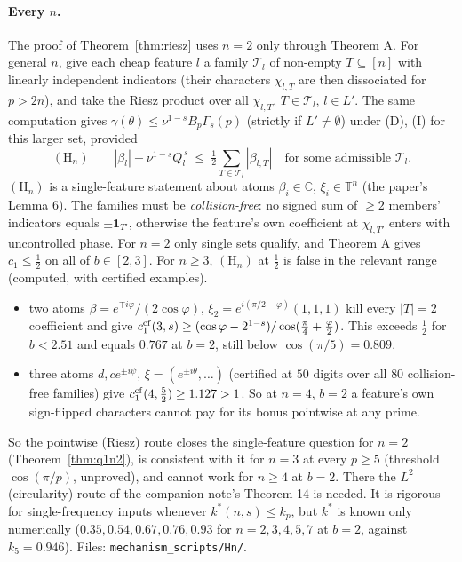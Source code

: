 \documentclass[11pt]{article}
\theoremstyle{definition}
\begin{document}
\paragraph{Every $n$.}  The proof of Theorem~\ref{thm:riesz} uses $n=2$ only through Theorem A.  For general $n$, give each
cheap feature $l$ a family $\mathcal T_l$ of non-empty $T\subseteq[n]$ with linearly independent indicators (their characters
$\chi_{l,T}$ are then dissociated for $p>2n$), and take the Riesz product over all $\chi_{l,T}$, $T\in\mathcal T_l$, $l\in L'$.  The same
computation gives $\gamma(\theta)\le\nu^{1-s}B_p\Gamma_s(p)$ (strictly if $L'\ne\emptyset$) under (D), (I) for this larger set, provided
\[(\mathrm H_n)\qquad|\beta_l|-\nu^{1-s}Q_l^{\,s}\ \le\ \tfrac12\textstyle\sum_{T\in\mathcal T_l}|\beta_{l,T}|\quad\text{for some admissible }\mathcal T_l .\]
$(\mathrm H_n)$ is a single-feature statement about atoms $\beta_i\in\mathbb C$, $\xi_i\in\mathbb T^n$ (the paper's Lemma 6).  The families must be
\emph{collision-free}: no signed sum of $\ge2$ members' indicators equals $\pm\mathbf 1_{T'}$, otherwise the feature's own coefficient at
$\chi_{l,T'}$ enters with uncontrolled phase.  For $n=2$ only single sets qualify, and Theorem A gives $c_1\le\frac12$ on all of $b\in[2,3]$.
For $n\ge3$, $(\mathrm H_n)$ at $\frac12$ is false in the relevant range (computed, with certified examples).
\begin{itemize}
\item[$n=3$:] two atoms $\beta=e^{\mp i\varphi}/(2\cos\varphi)$, $\xi_2=e^{i(\pi/2-\varphi)}(1,1,1)$ kill every $|T|=2$ coefficient and give
$c_1^{\rm cf}(3,s)\ge(\cos\varphi-2^{1-s})/\cos(\frac\pi4+\frac\varphi2)$.  This exceeds $\frac12$ for $b<2.51$ and equals $0.767$ at $b=2$, still below $\cos(\pi/5)=0.809$.
\item[$n=4$:] three atoms $d,ce^{\pm i\psi}$, $\xi=(e^{\pm i\theta},\dots)$ (certified at $50$ digits over all $80$ collision-free families) give
$c_1^{\rm cf}(4,\frac52)\ge1.127>1$.  So at $n=4$, $b=2$ a feature's own sign-flipped characters cannot pay for its bonus pointwise at any prime.
\end{itemize}
So the pointwise (Riesz) route closes the single-feature question for $n=2$ (Theorem~\ref{thm:q1n2}), is consistent with it for $n=3$ at
every $p\ge5$ (threshold $\cos(\pi/p)$, unproved), and cannot work for $n\ge4$ at $b=2$.  There the $L^2$ (circularity) route of the
companion note's Theorem 14 is needed.  It is rigorous for single-frequency inputs whenever $k^*(n,s)\le k_p$, but $k^*$ is known
only numerically ($0.35,0.54,0.67,0.76,0.93$ for $n=2,3,4,5,7$ at $b=2$, against $k_5=0.946$).  Files:
\texttt{mechanism\_scripts/Hn/}.
\end{document}
